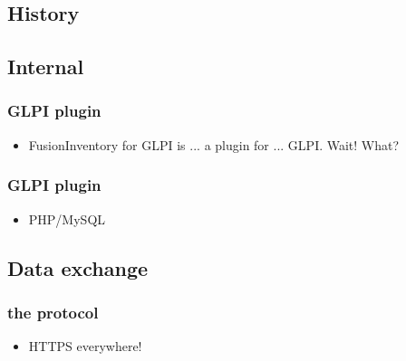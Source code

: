 %
%
\subsection{History}

\subsection{Internal}
\begin{frame}
\frametitle{GLPI plugin}
%
\begin{itemize}
\item FusionInventory for GLPI is ... a plugin for ... GLPI. Wait! What? 
%
\end{itemize}
\end{frame}

\begin{frame}
\frametitle{GLPI plugin}
%
\begin{itemize}
\item PHP/MySQL
%
\end{itemize}
\end{frame}

\subsection{Data exchange}
\begin{frame}
\frametitle{the protocol}
%
\begin{itemize}
\item HTTPS everywhere! 
%
\end{itemize}
\end{frame}



